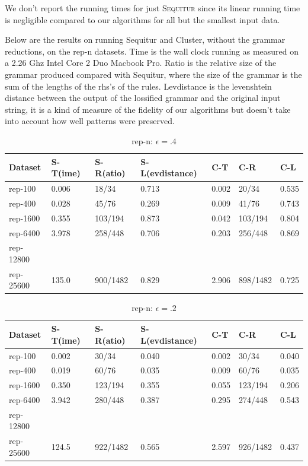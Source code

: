 \documentclass[11pt]{article}
\newcommand{\Sequitur}{\textsc{Sequitur}\xspace}
\begin{document}
We don't report the running times for just \Sequitur since its linear
running time is negligible compared to our algorithms for all but the
smallest input data.

Below are the results on running Sequitur and Cluster, without
the grammar reductions, on the rep-n datasets. Time is the wall clock
running as measured on a 2.26 Ghz Intel Core 2 Duo Macbook Pro.
Ratio is the relative size of the grammar produced compared with
Sequitur, where the size of the grammar is the sum of the lengths of the
rhs's of the rules. Levdistance is the levenshtein distance between
the output of the lossified grammar and the original input string, it
is a kind of measure of the fidelity of our algorithms but doesn't
take into account how well patterns were preserved.

\begin{table}[h]
\begin{tabular}{l|l|l|l|l|l|l}
Dataset & S-T(ime) & S-R(atio) & S-L(evdistance) & C-T & C-R & C-L \\
\hline
rep-100   & 0.006 & 18/34    & 0.713 & 0.002 & 20/34    & 0.535\\
rep-400   & 0.028 & 45/76    & 0.269 & 0.009 & 41/76    & 0.743\\
rep-1600  & 0.355 & 103/194  & 0.873 & 0.042 & 103/194  & 0.804\\
rep-6400  & 3.978 & 258/448  & 0.706 & 0.203 & 256/448  & 0.869\\
rep-12800 & & & & & & \\
rep-25600 & 135.0 & 900/1482 & 0.829 & 2.906 & 898/1482 & 0.725\\
\end{tabular}
\caption{rep-n: $\epsilon = .4$}
\end{table}

\begin{table}[h]
\begin{tabular}{l|l|l|l|l|l|l}
Dataset & S-T(ime) & S-R(atio) & S-L(evdistance) & C-T & C-R & C-L \\
\hline
rep-100   & 0.002 & 30/34    & 0.040 & 0.002 & 30/34    & 0.040\\
rep-400   & 0.019 & 60/76    & 0.035 & 0.009 & 60/76    & 0.035\\
rep-1600  & 0.350 & 123/194  & 0.355 & 0.055 & 123/194  & 0.206\\
rep-6400  & 3.942 & 280/448  & 0.387 & 0.295 & 274/448  & 0.543\\
rep-12800 & & & & & & \\
rep-25600 & 124.5 & 922/1482 & 0.565 & 2.597 & 926/1482 & 0.437\\
\end{tabular}
\caption{rep-n: $\epsilon = .2$}
\end{table}
\end{document}

